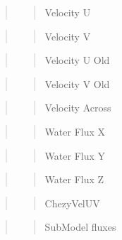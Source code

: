 \begin{quote}
\begin{quote}
Velocity U \end{quote}
\end{quote}


\begin{quote}
\begin{quote}
Velocity V \end{quote}
\end{quote}


\begin{quote}
\begin{quote}
Velocity U Old \end{quote}
\end{quote}


\begin{quote}
\begin{quote}
Velocity V Old \end{quote}
\end{quote}


\begin{quote}
\begin{quote}
Velocity Across \end{quote}
\end{quote}


\begin{quote}
\begin{quote}
Water Flux X \end{quote}
\end{quote}


\begin{quote}
\begin{quote}
Water Flux Y \end{quote}
\end{quote}


\begin{quote}
\begin{quote}
Water Flux Z \end{quote}
\end{quote}


\begin{quote}
\begin{quote}
Chezy\+Vel\+UV \end{quote}
\end{quote}


\begin{quote}
\begin{quote}
Sub\+Model fluxes \end{quote}
\end{quote}


